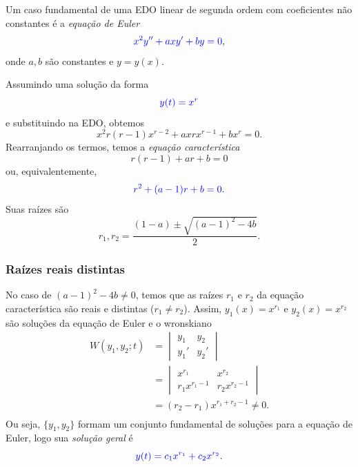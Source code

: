 Um caso fundamental de uma EDO linear de segunda ordem com coeficientes não constantes é a \emph{equação de Euler}
\begin{equation}
  {\color{blue}x^2y'' + axy' + by = 0},
\end{equation}
onde $a,b$ são constantes e $y = y(x)$.

Assumindo uma solução da forma
\begin{equation}
  {\color{blue}y(t) = x^r}
\end{equation}
e substituindo na EDO, obtemos
\begin{equation}
  x^2r(r-1)x^{r-2} + axrx^{r-1} + bx^r = 0.
\end{equation}
Rearranjando os termos, temos a \emph{equação característica}
\begin{equation}
  r(r-1) + ar + b = 0
\end{equation}
ou, equivalentemente,
\begin{equation}
  {\color{blue}r^2 + (a-1)r + b = 0}.
\end{equation}
Suas raízes são
\begin{equation}
  r_1, r_2 = \frac{(1-a)\pm\sqrt{(a-1)^2-4b}}{2}.
\end{equation}

\subsubsection{Raízes reais distintas}

No caso de $(a-1)^2-4b\neq 0$, temos que as raízes $r_1$ e $r_2$ da equação característica são reais e distintas ($r_1\neq r_2$). Assim, $y_1(x) = x^{r_1} $ e $y_2(x) = x^{r_2}$ são soluções da equação de Euler e o wronskiano
\begin{align}
  W(y_1,y_2;t) &=
                 \begin{vmatrix}
                   y_1 & y_2 \\
                   y_1' & y_2'
                 \end{vmatrix} \\
               &=
                 \begin{vmatrix}
                   x^{r_1} & x^{r_2} \\
                   r_1x^{r_1-1} & r_2x^{r_2-1}
                 \end{vmatrix} \\
               &= (r_2-r_1)x^{r_1+r_2-1} \neq 0.\\
\end{align}
Ou seja, $\{y_1,y_2\}$ formam um conjunto fundamental de soluções para a equação de Euler, logo sua \emph{solução geral} é
\begin{equation}
  {\color{blue}y(t) = c_1x^{r_1} + c_2x^{r_2}}.
\end{equation}

